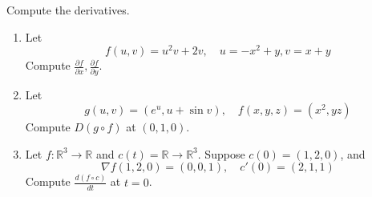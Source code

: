 \documentclass[openany]{book}
\newcommand{\R}{\mathbb{R}}
\begin{document}
\begin{prob}
    Compute the derivatives.
    \begin{enumerate}
        \item Let
        \begin{equation*}
            f(u,v)=u^2v+2v, \quad u=-x^2+y, v=x+y
        \end{equation*}
        Compute $\frac{\partial f}{\partial x},\frac{\partial f}{\partial y}$.
        \item Let 
        \begin{equation*}
            g(u,v)=(e^u, u+\sin v), \quad f(x,y,z)=(x^2, yz)
        \end{equation*}
        Compute $D(g\circ f)$ at $(0,1,0)$.
        \item Let $f:\R^3\to\R$ and $c(t)=\R\to\R^3$. Suppose $c(0)=(1,2,0)$, and 
        \begin{equation*}
            \nabla f(1,2,0)=(0,0,1), \quad c'(0)=(2,1,1)
        \end{equation*}
        Compute $\frac{d(f\circ c)}{dt}$ at $t=0$.
    \end{enumerate}
\end{prob}
\end{document}
